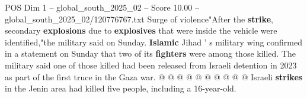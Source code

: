 \begin{textsample}{POS Dim 1 – global\_south\_2025\_02 – Score 10.00 – global\_south\_2025\_02/120776767.txt}
Surge of violence"After the \textbf{strike}, secondary \textbf{explosions} due to \textbf{explosives} that were inside the vehicle were identified,"the military said on Sunday. \textbf{Islamic} Jihad ' s military wing confirmed in a statement on Sunday that two of its \textbf{fighters} were among those killed.
The military said one of those killed had been released from Israeli detention in 2023 as part of the first truce in the Gaza war. @ @ @ @ @ @ @ @ @ @ Israeli \textbf{strikes} in the Jenin area had killed five people, including a 16-year-old.

\end{textsample}
